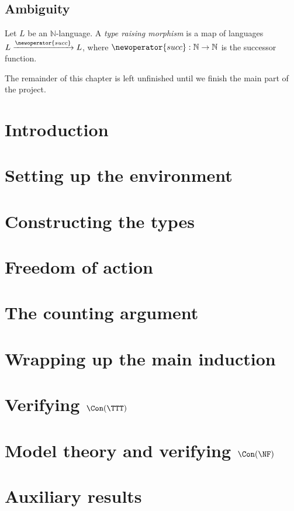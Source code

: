 \section{Ambiguity}
\begin{definition}
  Let \( L \) be an \( \mathbb N \)-language.
  A \emph{type raising morphism} is a map of languages \( L \xrightarrow{\newoperator{succ}} L \), where \( \newoperator{succ} : \mathbb N \to \mathbb N \) is the successor function.
\end{definition}
The remainder of this chapter is left unfinished until we finish the main part of the project.


\chapter{Introduction}
\label{c:introduction}


\chapter{Setting up the environment}
\label{c:environment}


\chapter{Constructing the types}
\label{c:construction}


\chapter{Freedom of action}
\label{c:foa}


\chapter{The counting argument}
\label{c:counting}


\chapter{Wrapping up the main induction}
\label{c:induction}


\chapter{Verifying \texorpdfstring{\( \Con(\TTT) \)}{Con(TTT)}}
\label{c:model}


\chapter{Model theory and verifying \texorpdfstring{\( \Con(\NF) \)}{Con(NF)}}
\label{c:model_theory}


\appendix
\chapter{Auxiliary results}
\label{c:auxiliary}





